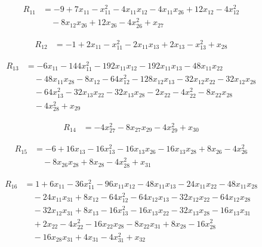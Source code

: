 \documentclass[11pt,letterpaper]{article}
\theoremstyle{definition}
\theoremstyle{remark}
\begin{document}
\begin{align*}
R_{11} &= -9 +7 x_{11} -x_{11}^{2} -4 x_{11} x_{12} -4 x_{11} x_{26} +12 x_{12} -4 x_{12}^{2} \\
&\quad -8 x_{12} x_{26} +12 x_{26} -4 x_{26}^{2} +x_{27}
\end{align*}

\begin{align*}
R_{12} &= -1 +2 x_{11} -x_{11}^{2} -2 x_{11} x_{13} +2 x_{13} -x_{13}^{2} +x_{28}
\end{align*}

\begin{align*}
R_{13} &= -6 x_{11} -144 x_{11}^{2} -192 x_{11} x_{12} -192 x_{11} x_{13} -48 x_{11} x_{22} \\
&\quad -48 x_{11} x_{28} -8 x_{12} -64 x_{12}^{2} -128 x_{12} x_{13} -32 x_{12} x_{22} -32 x_{12} x_{28} \\
&\quad -64 x_{13}^{2} -32 x_{13} x_{22} -32 x_{13} x_{28} -2 x_{22} -4 x_{22}^{2} -8 x_{22} x_{28} \\
&\quad -4 x_{28}^{2} +x_{29}
\end{align*}

\begin{align*}
R_{14} &= -4 x_{27}^{2} -8 x_{27} x_{29} -4 x_{29}^{2} +x_{30}
\end{align*}

\begin{align*}
R_{15} &= -6 +16 x_{13} -16 x_{13}^{2} -16 x_{13} x_{26} -16 x_{13} x_{28} +8 x_{26} -4 x_{26}^{2} \\
&\quad -8 x_{26} x_{28} +8 x_{28} -4 x_{28}^{2} +x_{31}
\end{align*}

\begin{align*}
R_{16} &= 1 +6 x_{11} -36 x_{11}^{2} -96 x_{11} x_{12} -48 x_{11} x_{13} -24 x_{11} x_{22} -48 x_{11} x_{28} \\
&\quad -24 x_{11} x_{31} +8 x_{12} -64 x_{12}^{2} -64 x_{12} x_{13} -32 x_{12} x_{22} -64 x_{12} x_{28} \\
&\quad -32 x_{12} x_{31} +8 x_{13} -16 x_{13}^{2} -16 x_{13} x_{22} -32 x_{13} x_{28} -16 x_{13} x_{31} \\
&\quad +2 x_{22} -4 x_{22}^{2} -16 x_{22} x_{28} -8 x_{22} x_{31} +8 x_{28} -16 x_{28}^{2} \\
&\quad -16 x_{28} x_{31} +4 x_{31} -4 x_{31}^{2} +x_{32}
\end{align*}
\end{document}
